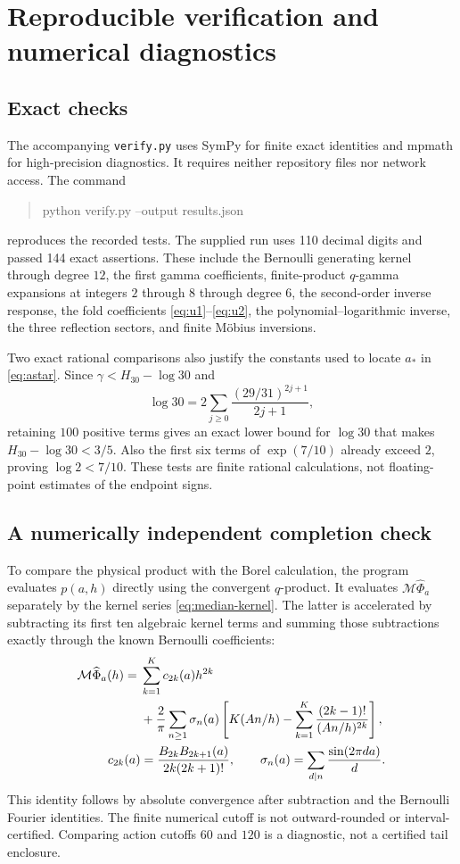 \documentclass[11pt,a4paper]{article}
\numberwithin{equation}{section}
\theoremstyle{definition}
\theoremstyle{remark}\newtheorem{remark}[theorem]{Remark}
\newcommand{\Med}{\mathcal M}\newcommand{\eps}{\varepsilon}
\begin{document}
\section{Reproducible verification and numerical diagnostics}
\label{sec:verification}

\subsection{Exact checks}
The accompanying \texttt{verify.py} uses SymPy for finite exact identities
and mpmath for high-precision diagnostics. It requires neither repository
files nor network access. The command
\begin{quote}\ttfamily
python verify.py --output results.json
\end{quote}
reproduces the recorded tests. The supplied run uses 110 decimal digits
and passed 144 exact assertions. These include the Bernoulli generating
kernel through degree $12$, the first gamma coefficients, finite-product
$q$-gamma expansions at integers $2$ through $8$ through degree $6$,
the second-order inverse response, the fold coefficients
\eqref{eq:u1}--\eqref{eq:u2}, the polynomial--logarithmic inverse,
the three reflection sectors, and finite M\"obius inversions.

Two exact rational comparisons also justify the constants used to
locate $a_*$ in \eqref{eq:astar}. Since
$\gamma<H_{30}-\log30$ and
\[
 \log30=2\sum_{j\ge0}\frac{(29/31)^{2j+1}}{2j+1},
\]
retaining $100$ positive terms gives an exact lower bound for $\log30$
that makes $H_{30}-\log30<3/5$. Also the first six terms of
$\exp(7/10)$ already exceed $2$, proving $\log2<7/10$.
These tests are finite rational calculations, not floating-point
estimates of the endpoint signs.

\subsection{A numerically independent completion check}
To compare the physical product with the Borel calculation, the program
evaluates $p(a,h)$ directly using the convergent $q$-product. It evaluates
$\Med\widehat\Phi_a$ separately by the kernel series
\eqref{eq:median-kernel}. The latter is accelerated by subtracting its
first ten algebraic kernel terms and summing those subtractions exactly
through the known Bernoulli coefficients:
\begin{align}
 \Med\widehat\Phi_a(h)
 ={}&\sum_{k=1}^{K}c_{2k}(a)h^{2k}\notag\\
 &+\frac2\pi\sum_{n\ge1}\sigma_n(a)
 \left[K(An/h)-\sum_{k=1}^{K}\frac{(2k-1)!}{(An/h)^{2k}}\right],
 \label{eq:acceleration}\\
 c_{2k}(a)&=\frac{B_{2k}B_{2k+1}(a)}{2k(2k+1)!},\qquad
 \sigma_n(a)=\sum_{d\mid n}\frac{\sin(2\pi da)}d.\notag
\end{align}
This identity follows by absolute convergence after subtraction and the
Bernoulli Fourier identities. The finite numerical cutoff is not
outward-rounded or interval-certified. Comparing action cutoffs $60$
and $120$ is a diagnostic, not a certified tail enclosure.
\end{document}
